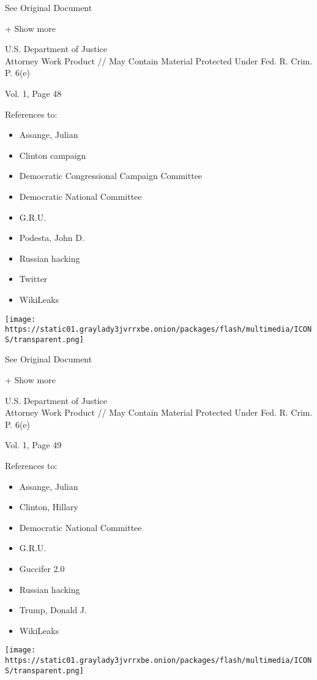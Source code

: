 See Original Document

+ Show more

U.S. Department of Justice\\
Attorney Work Product // May Contain Material Protected Under Fed. R.
Crim. P. 6(e)

Vol. 1, Page 48

References to:

\begin{itemize}
\tightlist
\item
  Assange, Julian
\item
  Clinton campaign
\item
  Democratic Congressional Campaign Committee
\item
  Democratic National Committee
\item
  G.R.U.
\item
  Podesta, John D.
\item
  Russian hacking
\item
  Twitter
\item
  WikiLeaks
\end{itemize}

\protect\hyperlink{}{}

\texttt{[image: https://static01.graylady3jvrrxbe.onion/packages/flash/multimedia/ICONS/transparent.png]}

See Original Document

+ Show more

U.S. Department of Justice\\
Attorney Work Product // May Contain Material Protected Under Fed. R.
Crim. P. 6(e)

Vol. 1, Page 49

References to:

\begin{itemize}
\tightlist
\item
  Assange, Julian
\item
  Clinton, Hillary
\item
  Democratic National Committee
\item
  G.R.U.
\item
  Guccifer 2.0
\item
  Russian hacking
\item
  Trump, Donald J.
\item
  WikiLeaks
\end{itemize}

\protect\hyperlink{}{}

\texttt{[image: https://static01.graylady3jvrrxbe.onion/packages/flash/multimedia/ICONS/transparent.png]}

